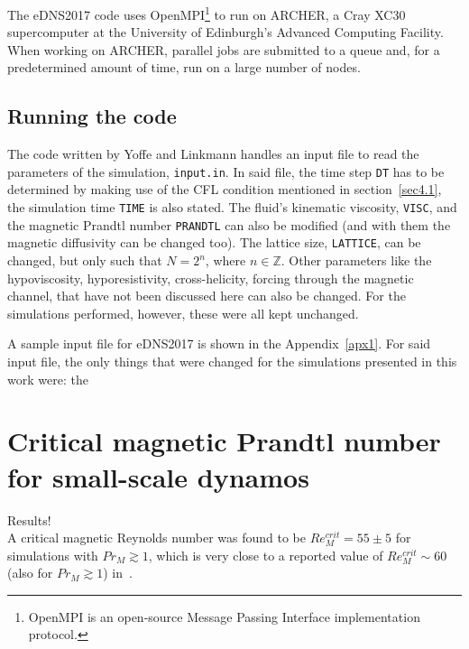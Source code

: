 \documentclass[12pt,a4paper]{report}
\begin{document}
The eDNS2017 code uses OpenMPI\footnote{OpenMPI is an open-source Message Passing Interface implementation protocol.} to run on ARCHER, a Cray XC30 supercomputer at the University of Edinburgh’s Advanced Computing Facility. When working on ARCHER, parallel jobs are submitted to a queue and, for a predetermined amount of time, run on a large number of nodes. %

\section{Running the code}

The code written by Yoffe and Linkmann handles an input file to read the parameters of the simulation, \texttt{input.in}. In said file, the time step \texttt{DT} has to be determined by making use of the CFL condition mentioned in section~\ref{sec4.1}, the simulation time \texttt{TIME} is also stated. The fluid's kinematic viscosity, \texttt{VISC}, and the magnetic Prandtl number \texttt{PRANDTL} can also be modified (and with them the magnetic diffusivity can be changed too). The lattice size, \texttt{LATTICE}, can be changed, but only such that $N=2^n$, where $n \in \mathbb{Z}$. Other parameters like the hypoviscosity, hyporesistivity, cross-helicity, forcing through the magnetic channel, that have not been discussed here can also be changed. For the simulations performed, however, these were all kept unchanged. 

A sample input file for eDNS2017 is shown in the Appendix~\ref{apx1}. For said input file, the only things that were changed for the simulations presented in this work were: the












\chapter{Critical magnetic Prandtl number for small-scale dynamos}

Results!\\

A critical magnetic Reynolds number was found to be $Re_M^{crit}=55\pm5$ for simulations with $Pr_M\gtrsim1$, which is very close to a reported value of $Re_M^{crit}\sim60$ (also for $Pr_M\gtrsim1$) in~\cite{schekochihin2007fluctuation}.\\
\end{document}
